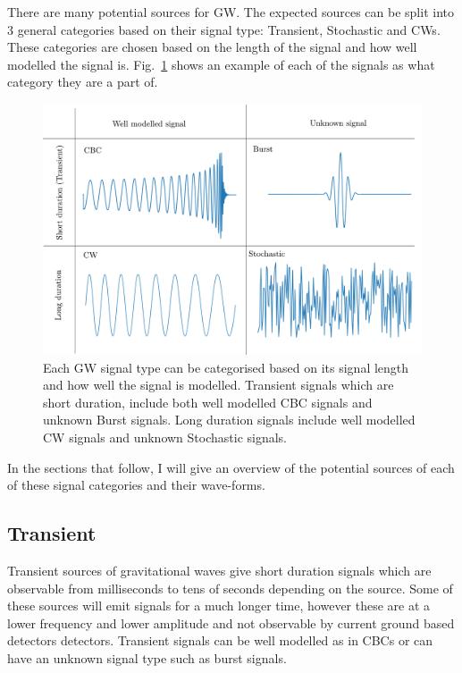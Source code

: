 There are many potential sources for \ac{GW}. The expected sources can be split into 3 general categories based on their signal type: Transient, Stochastic and \acp{CW}.
These categories are chosen based on the length of the signal and how well modelled the signal is.
Fig.~\ref{intro:sources:signaltypes} shows an example of each of the signals as what category they are a part of.
%
\begin{figure}[h]
    \centering
    \includegraphics[width=\textwidth]{C1_Introduction/sources_types.pdf}
    \caption{Each \ac{GW} signal type can be categorised based on its signal length and how well the signal is modelled. Transient signals which are short duration, include both well modelled \ac{CBC} signals and unknown Burst signals. Long duration signals include well modelled \ac{CW} signals and unknown Stochastic signals.}
    \label{intro:sources:signaltypes}
\end{figure}
In the sections that follow, I will give an overview of the potential sources of each of these signal categories and their wave-forms.


\subsection{\label{sources:transient} Transient}

Transient sources of gravitational waves give short duration signals which are observable from milliseconds to tens of seconds depending on the source. 
Some of these sources will emit signals for a much longer time, however these are at a lower frequency and lower amplitude and not observable by current ground based detectors detectors.
Transient signals can be well modelled as in \acp{CBC} or can have an unknown signal type such as burst signals.

